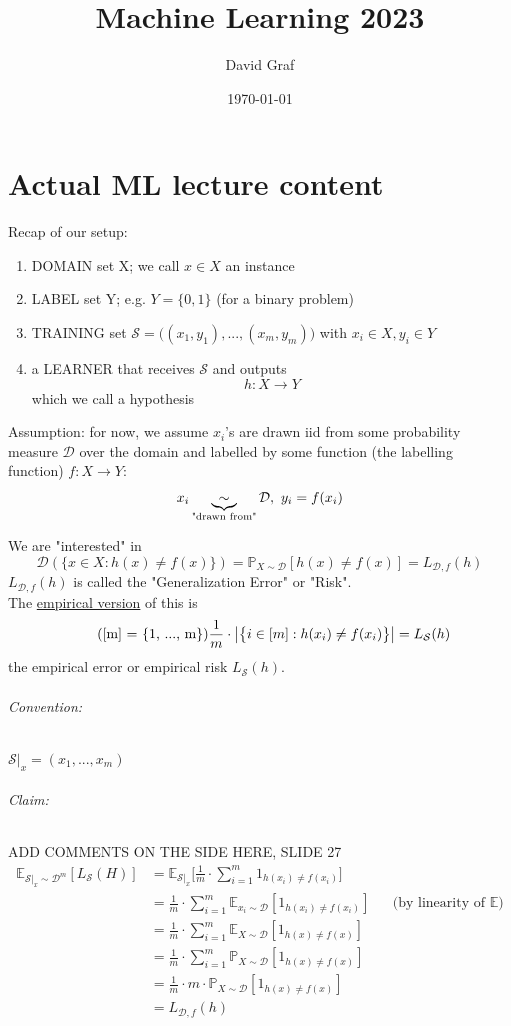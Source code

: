 \documentclass[10pt,a4paper]{article}
\title{Machine Learning 2023}
\author{David Graf}
\date{\today}
\theoremstyle{definition}
\theoremstyle{plain}
\begin{document}
	\maketitle
\part{Actual ML lecture content}
Recap of our setup:
\begin{enumerate}
	\item DOMAIN set X; we call $x\in X$ an instance
	\item LABEL set Y; e.g. $Y = \{0, 1\}$ (for a binary problem)
	\item TRAINING set $\mathcal{S} = \big((x_1, y_1), ..., (x_m, y_m)\big)$  with $x_i \in X, y_i \in Y$
	\item a LEARNER that receives $\mathcal{S}$ and outputs 
	$$ h: X \to Y$$
	which we call a hypothesis
\end{enumerate}
Assumption: for now, we assume $x_i$'s are drawn iid from some probability measure $\mathcal{D}$ over the domain and labelled by some function (the labelling function) $f: X \to Y$:
$$ x_i \underbrace{ \sim }_{\text{\scriptsize"drawn from"}} \mathcal{D},\ y_i = f(x_i)$$

We are "interested" in 
$$\mathcal{D}(\{x \in X: h(x) \neq f(x) \}) = \mathbb{P}_{X \sim \mathcal{D}}[h(x) \neq f(x)] = L_{\mathcal{D}, f}(h)$$
$L_{\mathcal{D}, f}(h)$ is called the "Generalization Error" or "Risk".\\
\newline
The \underline{empirical version} of this is 
\begin{equation}
	\tag{[m] = \{1, ..., m\}}
	\frac{1}{m}\cdot\big|\big\{ i \in [m]: h(x_i) \neq f(x_i) \big\}\big| = L_\mathcal{S}(h)
\end{equation}
the empirical error or empirical risk $L_\mathcal{S}(h)$.
\paragraph{Convention:}
$\mathcal{S}|_x = (x_1,..., x_m)$

\paragraph{Claim:}
ADD COMMENTS ON THE SIDE HERE, SLIDE 27
\begin{align*}
 \mathbb{E}_{\mathcal{S}|_x \sim \mathcal{D}^m}[L_\mathcal{S}(H)] &= \mathbb{E}_{\mathcal{S}|_x}\bigg[\frac{1}{m} \cdot \sum_{i=1}^{m} 1_{h(x_i) \neq f(x_i)}\bigg]\\
 &= \frac{1}{m} \cdot \sum_{i=1}^{m} \mathbb{E}_{x_i \sim \mathcal{D}}[1_{h(x_i) \neq f(x_i)}] && \text{(by linearity of $\mathbb{E}$)}\\
 &= \frac{1}{m} \cdot \sum_{i=1}^{m} \mathbb{E}_{X \sim \mathcal{D}}[1_{h(x) \neq f(x)}]\\
 &= \frac{1}{m} \cdot \sum_{i=1}^{m} \mathbb{P}_{X\sim \mathcal{D}}[1_{h(x) \neq f(x)}]\\
 &=  \frac{1}{m} \cdot m \cdot \mathbb{P}_{X\sim \mathcal{D}}[1_{h(x) \neq f(x)}]\\
 &= L_{\mathcal{D},f}(h)
\end{align*}
\end{document}
